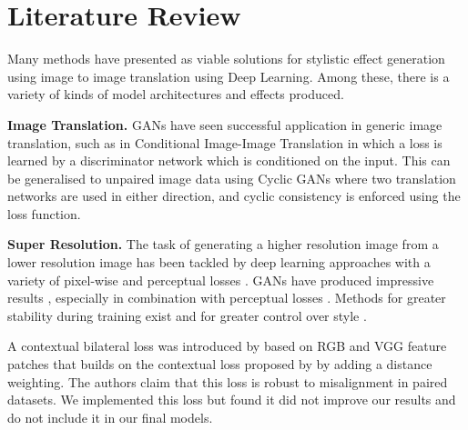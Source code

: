 \section{Literature Review}
\label{sec:literature-review}




Many methods have presented as viable solutions for stylistic effect generation using image to image translation using Deep Learning. Among these, there is a variety of kinds of model architectures and effects produced.

\vspace{5pt}\noindent\textbf{Image Translation. } GANs have seen successful application in generic image translation, such as in Conditional Image-Image Translation \cite{conditionalgan} in which a loss is learned by a discriminator network which is conditioned on the input. This can be generalised to unpaired image data using Cyclic GANs \cite{cyclicgan} where two translation networks are used in either direction, and cyclic consistency is enforced using the loss function.


\noindent\textbf{Super Resolution. } The task of generating a higher resolution image from a lower resolution image has been tackled by deep learning approaches  with a variety of pixel-wise and perceptual losses \cite{image-super-resolution-with-deep-networks,accurate-image-super-resolution, resolution-perceptual-losses}. GANs have produced impressive results \cite{gan-photo-realistic-super-resolution, esrgan-super-resolution}, especially in combination with perceptual losses \cite{pulse-gan-perceptual-super-resolution,recovering-texture-super-resolution}. Methods for greater stability during training  exist \cite{gan-progressive-stability-resolution} and for greater control over style \cite{gan-style-based-resolution}. 

\noindent A contextual bilateral loss was introduced by \cite{zoom-to-learn} based on RGB and VGG feature patches that builds on the contextual loss proposed by \cite{contextual-loss} by adding a distance weighting. The authors claim that this loss is robust to misalignment in paired datasets. We implemented this loss but found it did not improve our results and do not include it in our final models.

